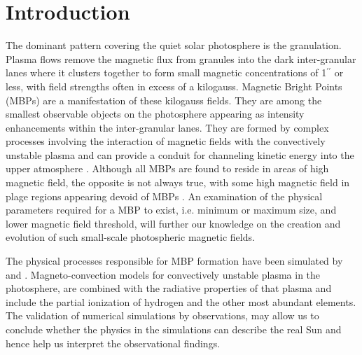 \documentclass{emulateapj}
\begin{document}
\section{Introduction}
\label{intro}
The dominant pattern covering the quiet solar photosphere is the granulation. Plasma flows remove the magnetic flux from granules into the dark inter-granular lanes where it clusters together to form small magnetic concentrations of 1$^{\prime\prime}$ or less, with field strengths often in excess of a kilogauss. Magnetic Bright Points (MBPs) are a manifestation of these kilogauss fields. They are among the smallest observable objects on the photosphere appearing as intensity enhancements within the inter-granular lanes. They are formed by complex processes involving the interaction of magnetic fields with the convectively unstable plasma and can provide a conduit for channeling kinetic energy into the upper atmosphere \cite[]{deWijn09}. Although all MBPs are found to reside in areas of high magnetic field, the opposite is not always true, with some high magnetic field in plage regions appearing  devoid of MBPs \cite[]{Ish07}.  An examination of the physical parameters required for a MBP to exist, i.e. minimum or maximum size, and lower magnetic field threshold, will further our knowledge on the creation and evolution of such small-scale photospheric magnetic fields.

The physical processes responsible for MBP formation have been simulated by \citet{shelyag2a} and \citet{shelyag2}.  Magneto-convection models for convectively unstable plasma in the photosphere, are combined with the radiative properties of that plasma and include the partial ionization of hydrogen and the other most abundant elements. The validation of numerical simulations by observations, may allow us to conclude whether the physics in the simulations can describe the real Sun and hence help us interpret the observational findings.
\end{document}
